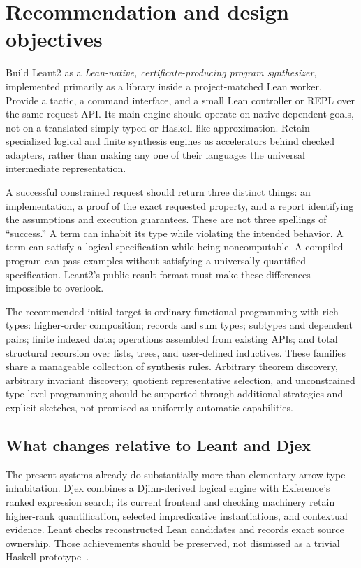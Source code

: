 \section{Recommendation and design objectives}
\label{sec:recommendation}

Build Leant2 as a \emph{Lean-native, certificate-producing program synthesizer}, implemented primarily as a library inside a project-matched Lean worker. Provide a tactic, a command interface, and a small Lean controller or REPL over the same request API. Its main engine should operate on native dependent goals, not on a translated simply typed or Haskell-like approximation. Retain specialized logical and finite synthesis engines as accelerators behind checked adapters, rather than making any one of their languages the universal intermediate representation.

A successful constrained request should return three distinct things: an implementation, a proof of the exact requested property, and a report identifying the assumptions and execution guarantees. These are not three spellings of ``success.'' A term can inhabit its type while violating the intended behavior. A term can satisfy a logical specification while being noncomputable. A compiled program can pass examples without satisfying a universally quantified specification. Leant2's public result format must make these differences impossible to overlook.

The recommended initial target is ordinary functional programming with rich types: higher-order composition; records and sum types; subtypes and dependent pairs; finite indexed data; operations assembled from existing APIs; and total structural recursion over lists, trees, and user-defined inductives. These families share a manageable collection of synthesis rules. Arbitrary theorem discovery, arbitrary invariant discovery, quotient representative selection, and unconstrained type-level programming should be supported through additional strategies and explicit sketches, not promised as uniformly automatic capabilities.

\subsection{What changes relative to Leant and Djex}

The present systems already do substantially more than elementary arrow-type inhabitation. Djex combines a Djinn-derived logical engine with Exference's ranked expression search; its current frontend and checking machinery retain higher-rank quantification, selected impredicative instantiations, and contextual evidence. Leant checks reconstructed Lean candidates and records exact source ownership. Those achievements should be preserved, not dismissed as a trivial Haskell prototype~\cite{leant,djex,internals}.

